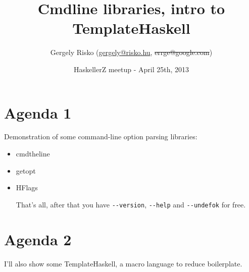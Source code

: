 \documentclass[]{article}
\title{Cmdline libraries, intro to TemplateHaskell}
\author{Gergely Risko (\href{mailto:gergely@risko.hu}{gergely@risko.hu},
                {\st{errge@google.com}})}
\date{HaskellerZ meetup - April 25th, 2013}
\newenvironment{Shaded}{}{}
\newcommand{\KeywordTok}[1]{\textcolor[rgb]{0.00,0.44,0.13}{\textbf{{#1}}}}
\newcommand{\DataTypeTok}[1]{\textcolor[rgb]{0.56,0.13,0.00}{{#1}}}
\newcommand{\DecValTok}[1]{\textcolor[rgb]{0.25,0.63,0.44}{{#1}}}
\newcommand{\StringTok}[1]{\textcolor[rgb]{0.25,0.44,0.63}{{#1}}}
\newcommand{\OtherTok}[1]{\textcolor[rgb]{0.00,0.44,0.13}{{#1}}}
\newcommand{\FunctionTok}[1]{\textcolor[rgb]{0.02,0.16,0.49}{{#1}}}
\newcommand{\NormalTok}[1]{{#1}}
\begin{document}
\maketitle

\section{Agenda 1}

Demonstration of some command-line option parsing libraries:

\begin{itemize}
\item
  cmdtheline
\item
  getopt
\item
  HFlags

\begin{Shaded}
\end{Shaded}

  That's all, after that you have \texttt{-{}-version},
  \texttt{-{}-help} and \texttt{-{}-undefok} for free.
\end{itemize}

\section{Agenda 2}

I'll also show some TemplateHaskell, a macro language to reduce
boilerplate.
\end{document}
